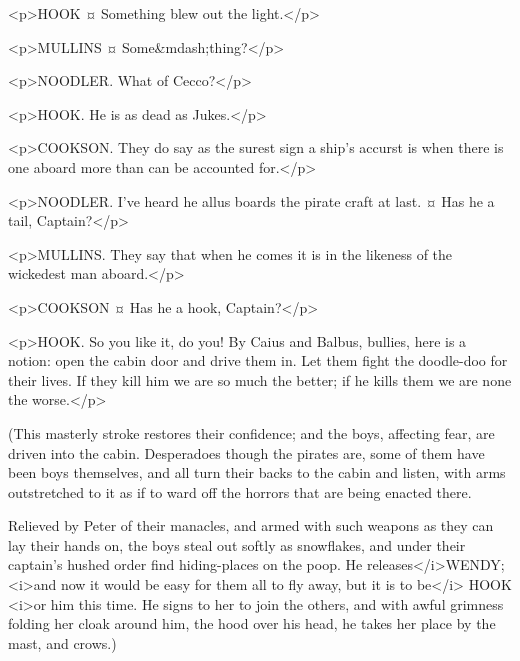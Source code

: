 \begin{drama}
<p>HOOK ¤
Something blew out the light.</p>

<p>MULLINS ¤
Some&mdash;thing?</p>

<p>NOODLER. What of Cecco?</p>

<p>HOOK. He is as dead as Jukes.</p>


<p>COOKSON. They do say as the surest sign a ship's accurst is when there is one aboard more than can be accounted for.</p>

<p>NOODLER. I've heard he allus boards the pirate craft at last.
¤
Has he a tail, Captain?</p>

<p>MULLINS. They say that when he comes it is in the likeness of the wickedest man aboard.</p>

<p>COOKSON ¤
Has he a hook, Captain?</p>


<p>HOOK. So you like it, do you! By Caius and Balbus, bullies, here is a notion: open the cabin door and drive them in. Let them fight the doodle-doo for their lives. If they kill him we are so much the better; if he kills them we are none the worse.</p>

\begin{stagedir}
(This masterly stroke restores their confidence; and the boys, affecting fear, are driven into the cabin. Desperadoes though the pirates are, some of them have been boys themselves, and all turn their backs to the cabin and listen, with arms outstretched to it as if to ward off the horrors that are being enacted there.

Relieved by Peter of their manacles, and armed with such weapons as they can lay their hands on, the boys steal out softly as snowflakes, and under their captain's hushed order find hiding-places on the poop. He releases</i>WENDY; <i>and now it would be easy for them all to fly away, but it is to be</i> HOOK <i>or him this time. He signs to her to join the others, and with awful grimness folding her cloak around him, the hood over his head, he takes her place by the mast, and crows.)
\end{stagedir}


\end{drama}
